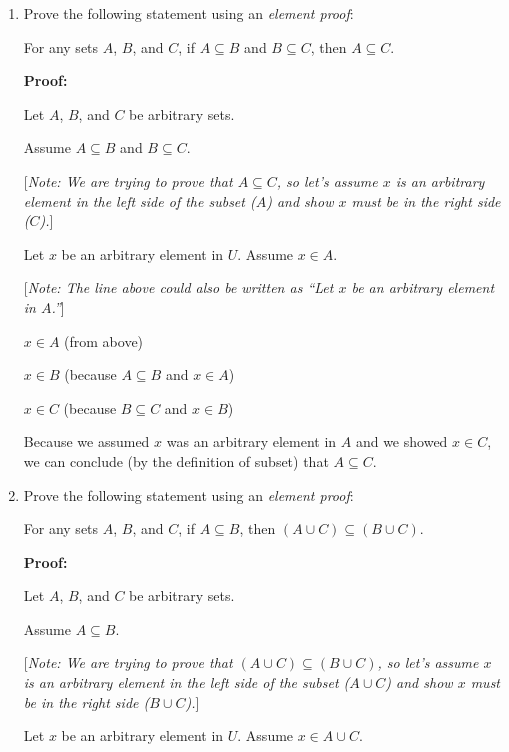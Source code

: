 \documentclass[11pt, letterpaper]{report}
\newcommand{\proofnote}[1]{[\textit{Note: #1}]}
\begin{document}
\begin{enumerate}

	\item Prove the following statement using an \textit{element proof}:
	
	For any sets $A$, $B$, and $C$, if $A \subseteq B$ and $B \subseteq C$, then
	$A \subseteq C$.
	
	\textbf{Proof:}
	
	Let $A$, $B$, and $C$ be arbitrary sets.
        
        Assume $A \subseteq B$ and $B \subseteq C$.
        
        \proofnote{We are trying to prove that $A \subseteq C$, so let's assume $x$ is an arbitrary element in the left side of the subset
        ($A$) and show $x$ must be in the right side ($C$).}
        
        Let $x$ be an arbitrary element in $U$.  Assume $x \in A$.  
        
        \proofnote{The line above could also be written as ``Let $x$ be an arbitrary element in $A$.''}
        
        $x \in A$ \qquad (from above)
        
        $x \in B$ \qquad (because $A \subseteq B$ and $x \in A$)
        
        $x \in C$ \qquad (because $B \subseteq C$ and $x \in B$)
        
                
        Because we assumed $x$ was an arbitrary element in $A$ and we showed $x \in C$, we can conclude (by the definition of subset)
        that $A \subseteq C$.

	
	\item Prove the following statement using an \textit{element proof}:
	
	For any sets $A$, $B$, and $C$, if $A \subseteq B$, then
	$(A \cup C) \subseteq (B \cup C)$.
	
	\textbf{Proof:}
	
	Let $A$, $B$, and $C$ be arbitrary sets.
        
        Assume $A \subseteq B$.
        
        \proofnote{We are trying to prove that $(A \cup C) \subseteq (B \cup C)$, so let's assume $x$ is an arbitrary element in the left side of the subset
        ($A \cup C$) and show $x$ must be in the right side ($B \cup C$).}
        
        Let $x$ be an arbitrary element in $U$.  Assume $x \in A \cup C$.  
        

\end{enumerate}
\end{document}
